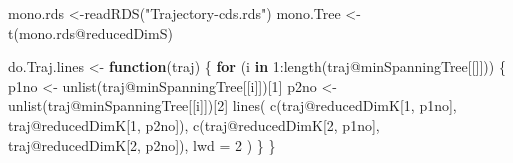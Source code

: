 \documentclass[
  openany]{book}
\newenvironment{Shaded}{\begin{snugshade}}{\end{snugshade}}
\newcommand{\AttributeTok}[1]{\textcolor[rgb]{0.77,0.63,0.00}{#1}}
\newcommand{\ControlFlowTok}[1]{\textcolor[rgb]{0.13,0.29,0.53}{\textbf{#1}}}
\newcommand{\DecValTok}[1]{\textcolor[rgb]{0.00,0.00,0.81}{#1}}
\newcommand{\FunctionTok}[1]{\textcolor[rgb]{0.00,0.00,0.00}{#1}}
\newcommand{\NormalTok}[1]{#1}
\newcommand{\OtherTok}[1]{\textcolor[rgb]{0.56,0.35,0.01}{#1}}
\newcommand{\SpecialCharTok}[1]{\textcolor[rgb]{0.00,0.00,0.00}{#1}}
\newcommand{\StringTok}[1]{\textcolor[rgb]{0.31,0.60,0.02}{#1}}
\begin{document}
\begin{Shaded}
\end{Shaded}

\begin{Shaded}
\begin{Highlighting}[]
\NormalTok{mono.rds }\OtherTok{\textless{}{-}}\FunctionTok{readRDS}\NormalTok{(}\StringTok{"Trajectory{-}cds.rds"}\NormalTok{)}
\NormalTok{mono.Tree }\OtherTok{\textless{}{-}} \FunctionTok{t}\NormalTok{(mono.rds}\SpecialCharTok{@}\NormalTok{reducedDimS)}
\end{Highlighting}
\end{Shaded}

\begin{Shaded}
\begin{Highlighting}[]
\NormalTok{do.Traj.lines }\OtherTok{\textless{}{-}} \ControlFlowTok{function}\NormalTok{(traj) \{}
  \ControlFlowTok{for}\NormalTok{ (i }\ControlFlowTok{in} \DecValTok{1}\SpecialCharTok{:}\FunctionTok{length}\NormalTok{(traj}\SpecialCharTok{@}\NormalTok{minSpanningTree[[]])) \{}
\NormalTok{    p1no }\OtherTok{\textless{}{-}} \FunctionTok{unlist}\NormalTok{(traj}\SpecialCharTok{@}\NormalTok{minSpanningTree[[i]])[}\DecValTok{1}\NormalTok{]}
\NormalTok{    p2no }\OtherTok{\textless{}{-}} \FunctionTok{unlist}\NormalTok{(traj}\SpecialCharTok{@}\NormalTok{minSpanningTree[[i]])[}\DecValTok{2}\NormalTok{]}
    \FunctionTok{lines}\NormalTok{(}
      \FunctionTok{c}\NormalTok{(traj}\SpecialCharTok{@}\NormalTok{reducedDimK[}\DecValTok{1}\NormalTok{, p1no],}
\NormalTok{        traj}\SpecialCharTok{@}\NormalTok{reducedDimK[}\DecValTok{1}\NormalTok{, p2no]),}
      \FunctionTok{c}\NormalTok{(traj}\SpecialCharTok{@}\NormalTok{reducedDimK[}\DecValTok{2}\NormalTok{, p1no],}
\NormalTok{        traj}\SpecialCharTok{@}\NormalTok{reducedDimK[}\DecValTok{2}\NormalTok{, p2no]),}
      \AttributeTok{lwd =} \DecValTok{2}
\NormalTok{    )}
\NormalTok{  \}}
\NormalTok{\}}
\end{Highlighting}
\end{Shaded}
\end{document}
